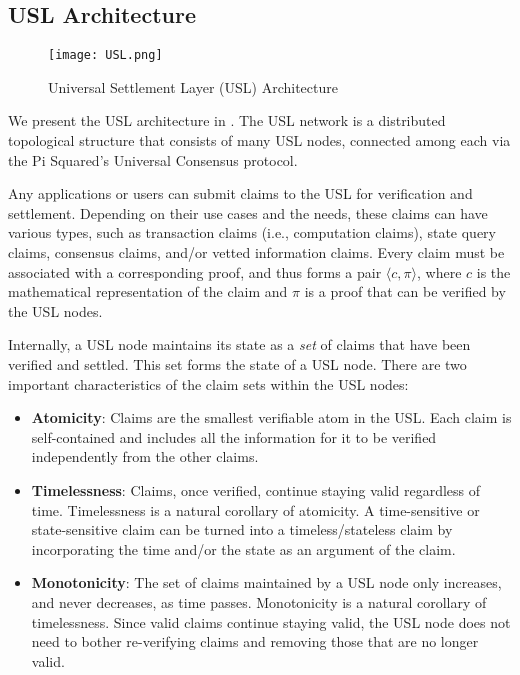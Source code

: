 \documentclass{article}
\begin{document}
\subsection{USL Architecture}

\begin{figure}
\centering
\texttt{[image: USL.png]}
\caption{Universal Settlement Layer (USL) Architecture}
\label{fig:usl}
\end{figure}

We present the USL architecture in . 
The USL network is a distributed topological structure that consists of many USL nodes, connected among each
via the Pi Squared's Universal Consensus protocol. 

Any applications or users can submit claims to the USL for verification and settlement. 
Depending on their use cases and the needs, these claims can have various types,
such as transaction claims (i.e., computation claims), 
state query claims, consensus claims, and/or vetted information claims. 
Every claim must be associated with a corresponding proof, and thus forms
a pair $\langle c, \pi \rangle$, where $c$ is the mathematical representation of the claim
and $\pi$ is a proof that can be verified by the USL nodes. 

Internally, a USL node maintains its state as a \emph{set} of claims that have been verified and settled. 
This set forms the state of a USL node. 
There are two important characteristics of the claim sets within the USL nodes:
\begin{itemize}
    \item \textbf{Atomicity}: Claims are the smallest verifiable atom in the USL. 
     Each claim is self-contained and includes all the information for it to be 
     verified independently from the other claims. 
    \item \textbf{Timelessness}: Claims, once verified, continue staying valid regardless of time.  
     Timelessness is a natural corollary of atomicity. A time-sensitive or state-sensitive claim can be turned into
     a timeless/stateless claim by incorporating the time and/or the state as an argument of the claim. 
    \item \textbf{Monotonicity}: The set of claims maintained by a USL node only increases, and never decreases, as time passes. Monotonicity is a natural corollary of timelessness. Since valid claims continue staying valid, the USL node does not need to bother re-verifying claims and removing those that are no longer valid. 
\end{itemize}
\end{document}
